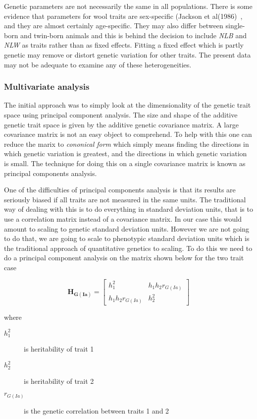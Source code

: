 \documentclass[titlepage]{article}  %
\begin{document}
Genetic parameters are not necessarily the same in all populations. There is some evidence that parameters for wool traits are sex-specific (Jackson et al(1986)~\cite{jack:86}, and they are almost certainly age-specific. They may also differ between single-born and twin-born animals and this is behind the decision to include {\em NLB} and {\em NLW} as traits rather than as fixed effects. Fitting a fixed effect which is partly genetic may remove or distort genetic variation for other traits. The present data may not be adequate to examine any of these heterogeneities.

\subsubsection{Multivariate analysis}
The initial approach was to simply look at the dimensionality of the genetic trait space using principal component analysis. The size and shape of the additive genetic trait space is given by the additive genetic covariance matrix. A large covariance matrix is not an easy object to comprehend. To help with this one can reduce the marix to {\em cononical form} which simply means finding the directions in which genetic variation is greatest, and the directions in which genetic variation is small. The technique for doing this on a single covariance matrix is known as principal components analysis.

One of the difficulties of principal components analysis is that its results are seriously biased if all traits are not measured in the same units. The traditional way of dealing with this is to do everything in standard deviation units, that is to use a correlation matrix instead of a covariance matrix. In our case this would amount to scaling to genetic standard deviation units. However we are not going to do that, we are going to scale to phenotypic standard deviation units which is the traditional approach of quantitative genetics to scaling. To do this we need to do a principal component analysis on the matrix shown below for the two trait case

\begin{displaymath}
\bm{H_{G(Ia)}} = 
 \left[ \begin{array}{cc}
 h^{2}_{1} & h_{1}h_{2}r_{G(Ia)} \\
 h_{1}h_{2}r_{G(Ia)} & h^{2}_{2}
\end{array} \right]
\end{displaymath}

 where 
\begin{description}
\item[$h^{2}_{1}$] is heritability of trait 1
\item[$h^{2}_{2}$] is heritability of trait 2
\item[$r_{G(Ia)}$] is the genetic correlation between traits 1 and 2
\end{description}
\end{document}
